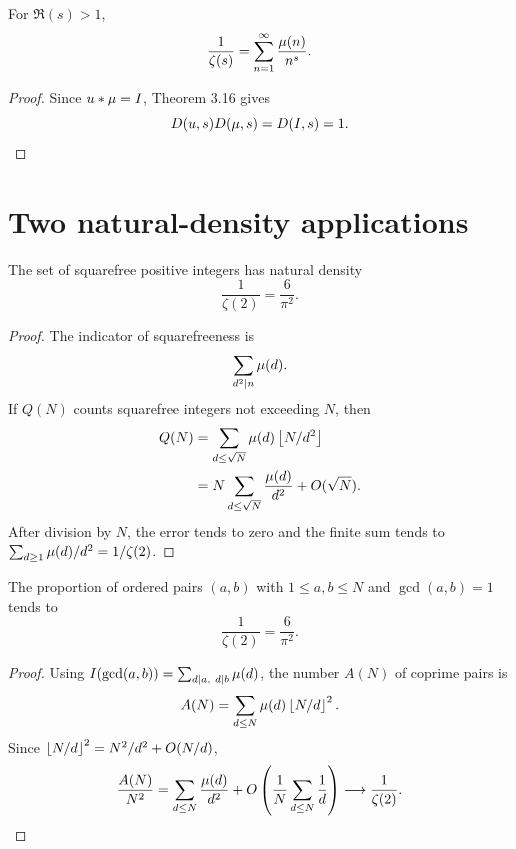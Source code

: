 \begin{thm}
For $\Re(s)>1$,
\[
 \frac1{\zeta(s)}=\sum_{n=1}^{\infty}\frac{\mu(n)}{n^s}.
\]
\end{thm}
\begin{proof}
Since $u*\mu=I$, Theorem 3.16 gives
\[
 D(u,s)D(\mu,s)=D(I,s)=1.
\]
\end{proof}

\section{Two natural-density applications}

\begin{prop}
The set of squarefree positive integers has natural density
\[
 \frac1{\zeta(2)}=\frac6{\pi^2}.
\]
\end{prop}
\begin{proof}
The indicator of squarefreeness is
\[
 \sum_{d^2\mid n}\mu(d).
\]
If $Q(N)$ counts squarefree integers not exceeding $N$, then
\begin{align*}
 Q(N)
 &=\sum_{d\le\sqrt N}\mu(d)\left\lfloor N/d^2 \right\rfloor\\
 &=N\sum_{d\le\sqrt N}\frac{\mu(d)}{d^2}+O(\sqrt N).
\end{align*}
After division by $N$, the error tends to zero and the finite sum tends to
$\sum_{d\ge1}\mu(d)/d^2=1/\zeta(2)$.
\end{proof}

\begin{prop}
The proportion of ordered pairs $(a,b)$ with $1\le a,b\le N$ and $\gcd(a,b)=1$ tends to
\[
 \frac1{\zeta(2)}=\frac6{\pi^2}.
\]
\end{prop}
\begin{proof}
Using $I(\gcd(a,b))=\sum_{d\mid a,\ d\mid b}\mu(d)$, the number $A(N)$ of coprime pairs is
\[
 A(N)=\sum_{d\le N}\mu(d)\left\lfloor N/d \right\rfloor^2.
\]
Since $\left\lfloor N/d \right\rfloor^2=N^2/d^2+O(N/d)$,
\[
 \frac{A(N)}{N^2}
 =\sum_{d\le N}\frac{\mu(d)}{d^2}
 +O\left(\frac1N\sum_{d\le N}\frac1d\right)
 \longrightarrow\frac1{\zeta(2)}.
\]
\end{proof}
